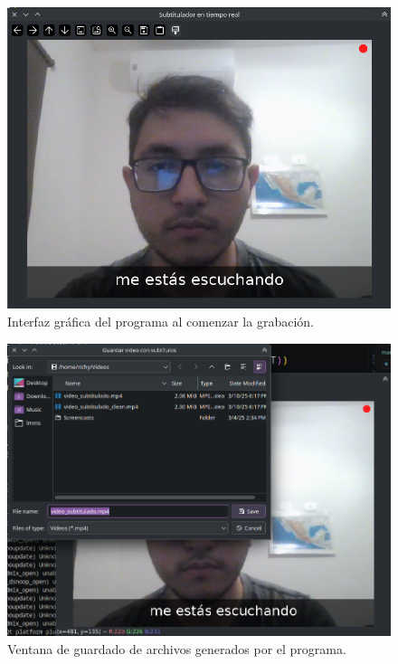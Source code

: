 \documentclass[conference]{IEEEtran}
\begin{document}
\begin{figure}[ht]
    \centering
    \includegraphics[width=\columnwidth]{images/rec-UI.png}
    \caption{Interfaz gráfica del programa al comenzar la grabación.}
    \label{fig:rec-UI}
\end{figure}

\begin{figure}[ht]
    \centering
    \includegraphics[width=\columnwidth]{images/save-window.png}
    \caption{Ventana de guardado de archivos generados por el programa.}
    \label{fig:save-window}
\end{figure}
\end{document}
